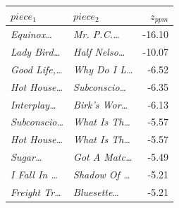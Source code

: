 \begin{tabular}{llr}
\toprule
$piece_1$ & $piece_2$ & $z_{ppm}$ \\
\midrule
\textit{Equinox\dots} & \textit{Mr. P.C.\dots} & -16.10 \\
\textit{Lady Bird\dots} & \textit{Half Nelso\dots} & -10.07 \\
\textit{Good Life,\dots} & \textit{Why Do I L\dots} & -6.52 \\
\textit{Hot House\dots} & \textit{Subconscio\dots} & -6.35 \\
\textit{Interplay\dots} & \textit{Birk's Wor\dots} & -6.13 \\
\textit{Subconscio\dots} & \textit{What Is Th\dots} & -5.57 \\
\textit{Hot House\dots} & \textit{What Is Th\dots} & -5.57 \\
\textit{Sugar\dots} & \textit{Got A Matc\dots} & -5.49 \\
\textit{I Fall In \dots} & \textit{Shadow Of \dots} & -5.21 \\
\textit{Freight Tr\dots} & \textit{Bluesette\dots} & -5.21 \\
\bottomrule
\end{tabular}
